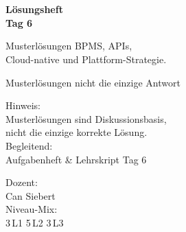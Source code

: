 \documentclass[11pt,a4paper,oneside]{article}
\begin{document}
\begin{titlepage}
  \pagestyle{empty}
  \vspace*{1.5cm}
  \\[2pt]
  \noindent{\color{lpAccent}\rule{\linewidth}{1.2pt}}\\[4pt]

  \vspace{3cm}
  {\sffamily\fontsize{30}{34}\selectfont\bfseries\color{lpInk}L\"osungsheft\\Tag 6\par}

  \vspace{0.7cm}
  {\sffamily\large\color{lpGray}Musterl\"osungen \textendash{} BPMS, APIs,\\Cloud-native und Plattform-Strategie.\par}

  \vspace{1.5cm}
  {\caveatfont\LARGE\color{lpGreen}Musterl\"osungen \textperiodcentered{} nicht die einzige Antwort}\par

  \vfill

  \noindent\begin{minipage}{0.55\linewidth}
    {\sffamily\footnotesize\color{lpGray}Hinweis:}\\
    {\sffamily\small\color{lpInk}Musterl\"osungen sind Diskussionsbasis,\\nicht die einzige korrekte L\"osung.}\\[10pt]
    {\sffamily\footnotesize\color{lpGray}Begleitend:}\\
    {\sffamily\small\color{lpInk}Aufgabenheft \& Lehrskript Tag 6}
  \end{minipage}\hfill
  \begin{minipage}{0.4\linewidth}
    \raggedleft
    {\sffamily\footnotesize\color{lpGray}Dozent:}\\
    {\sffamily\small\color{lpInk}Can Siebert}\\[10pt]
    {\sffamily\footnotesize\color{lpGray}Niveau-Mix:}\\
    {\sffamily\small\color{lpInk}3\,L1 \textperiodcentered{} 5\,L2 \textperiodcentered{} 3\,L3}
  \end{minipage}

  \vspace{0.5cm}
  \noindent{\color{lpAccent}\rule{\linewidth}{0.6pt}}
\end{titlepage}
\end{document}
